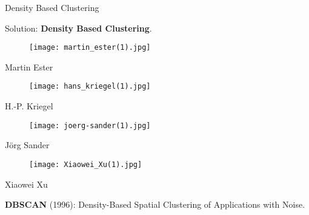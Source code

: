 \documentclass[aspectratio=169]{beamer}
\begin{document}
\begin{frame}{Density Based Clustering}

    Solution: \textbf{Density Based Clustering}.

    \vspace{0.3cm}

    \begin{minipage}[b]{0.20\textwidth}
        \begin{figure}
            \centering
            \texttt{[image: martin\_ester(1).jpg]}
        \end{figure}
        \centering Martin Ester
    \end{minipage}
    \hfill
    \begin{minipage}[b]{0.20\textwidth}
        \begin{figure}
            \centering
            \texttt{[image: hans\_kriegel(1).jpg]}
        \end{figure}
        \centering H.-P. Kriegel
    \end{minipage}
    \hfill
    \begin{minipage}[b]{0.20\textwidth}
        \begin{figure}
            \centering
            \texttt{[image: joerg-sander(1).jpg]}
        \end{figure}
        \centering Jörg Sander
    \end{minipage}
    \hfill
    \begin{minipage}[b]{0.20\textwidth}
        \begin{figure}
            \centering
            \texttt{[image: Xiaowei\_Xu(1).jpg]}
        \end{figure}
        \centering Xiaowei Xu
    \end{minipage}

    \vspace{0.5cm}

    \textbf{DBSCAN} (1996)\cite{original_paper}: Density-Based Spatial Clustering of Applications with Noise.
\end{frame}
\end{document}
